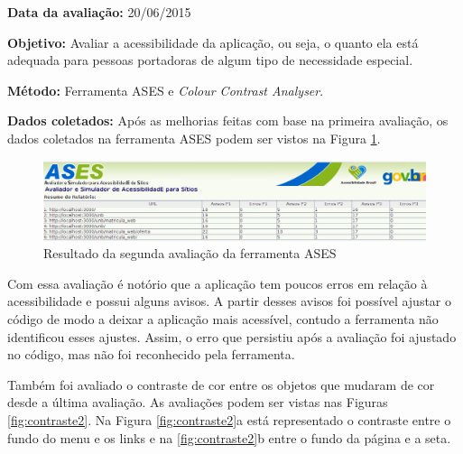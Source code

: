 \flushleft \textbf{Data da avaliação:} 
20/06/2015

\textbf{Objetivo:}
Avaliar a acessibilidade da aplicação, ou seja, o quanto ela está adequada para pessoas portadoras de algum tipo
de necessidade especial.

\textbf{Método:}
Ferramenta ASES e \textit{Colour Contrast Analyser}.

\textbf{Dados coletados:}
Após as melhorias feitas com base na primeira avaliação, os dados coletados na ferramenta ASES podem ser vistos na Figura \ref{fig:avaliacao_ases}.

\begin{figure}[h!]
  \flushleft
    \includegraphics[keepaspectratio=true, scale=0.6]{figuras/avaliacao_ases.png}
  \caption{Resultado da segunda avaliação da ferramenta ASES}
  \label{fig:avaliacao_ases}
\end{figure}

Com essa avaliação é notório que a aplicação tem poucos erros em relação à acessibilidade e possui alguns avisos.
A partir desses avisos foi possível ajustar o código de modo a deixar a aplicação mais acessível, contudo a ferramenta não
identificou esses ajustes. Assim, o erro que persistiu após a avaliação foi ajustado no código, mas não foi reconhecido pela ferramenta.

Também foi avaliado o contraste de cor entre os objetos que mudaram de cor desde a última avaliação. As avaliações podem ser vistas nas Figuras 
\ref{fig:contraste2}. Na Figura \ref{fig:contraste2}a está representado o contraste entre o fundo do menu e os links e na \ref{fig:contraste2}b entre o fundo da página e a seta.

